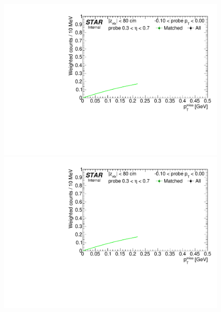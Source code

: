 \begin{figure}[ht]
{  \includegraphics[width=\linewidth,page=9]{graphics/correctionsToEff/TOF_tagAndProbe/Fitting_effVsPt_data_ETABINS_A.CPT2.pdf}\\
  \includegraphics[width=\linewidth,page=11]{graphics/correctionsToEff/TOF_tagAndProbe/Fitting_effVsPt_data_ETABINS_A.CPT2.pdf}

}
\end{figure}

